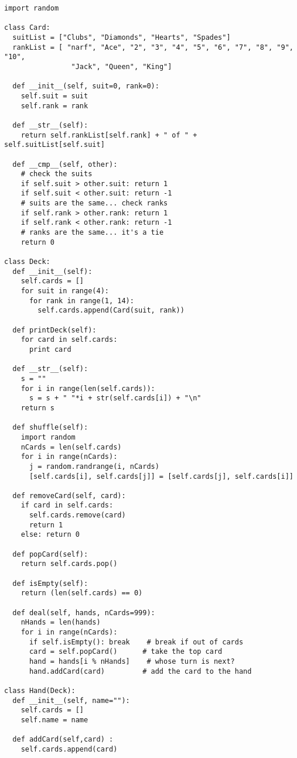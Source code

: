 \beforeverb
\begin{verbatim}
import random

class Card:
  suitList = ["Clubs", "Diamonds", "Hearts", "Spades"]
  rankList = [ "narf", "Ace", "2", "3", "4", "5", "6", "7", "8", "9", "10",
                "Jack", "Queen", "King"]

  def __init__(self, suit=0, rank=0):
    self.suit = suit
    self.rank = rank

  def __str__(self):
    return self.rankList[self.rank] + " of " + self.suitList[self.suit]

  def __cmp__(self, other):
    # check the suits
    if self.suit > other.suit: return 1
    if self.suit < other.suit: return -1
    # suits are the same... check ranks
    if self.rank > other.rank: return 1
    if self.rank < other.rank: return -1
    # ranks are the same... it's a tie
    return 0

class Deck:
  def __init__(self):
    self.cards = []
    for suit in range(4):
      for rank in range(1, 14):
        self.cards.append(Card(suit, rank))

  def printDeck(self):
    for card in self.cards:
      print card

  def __str__(self):
    s = ""
    for i in range(len(self.cards)):
      s = s + " "*i + str(self.cards[i]) + "\n"
    return s

  def shuffle(self):
    import random
    nCards = len(self.cards)
    for i in range(nCards):
      j = random.randrange(i, nCards)
      [self.cards[i], self.cards[j]] = [self.cards[j], self.cards[i]]

  def removeCard(self, card):
    if card in self.cards:
      self.cards.remove(card)
      return 1
    else: return 0

  def popCard(self):
    return self.cards.pop()

  def isEmpty(self):
    return (len(self.cards) == 0)

  def deal(self, hands, nCards=999):
    nHands = len(hands)
    for i in range(nCards):
      if self.isEmpty(): break    # break if out of cards
      card = self.popCard()      # take the top card
      hand = hands[i % nHands]    # whose turn is next?
      hand.addCard(card)         # add the card to the hand

class Hand(Deck):
  def __init__(self, name=""):
    self.cards = []
    self.name = name

  def addCard(self,card) :
    self.cards.append(card)


\end{verbatim}
